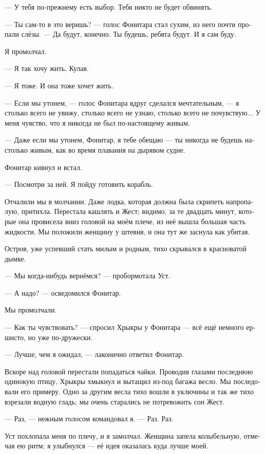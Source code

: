 \documentclass[a4paper,10pt,fleqn]{book}\usepackage{polyglossia}\setdefaultlanguage[babelshorthands=true]{russian}\setotherlanguage{english}\defaultfontfeatures{Ligatures=TeX,Mapping=tex-text}
\newcommand{\asterism}{\vspace{1em}{\centering\Large\bfseries$\ast~\ast~\ast$\par}\vspace{1em}}
\begin{document}
--- У тебя по-прежнему есть выбор.
Тебя никто не будет обвинять.

--- Ты сам-то в это веришь? --- голос Фонитара стал сухим, из него почти пропали слёзы.
--- Да будут, конечно.
Ты будешь, ребята будут.
И я сам буду.

Я промолчал.

--- Я так хочу жить, Кулав.

--- Я тоже.
И она тоже хочет жить.

--- Если мы утонем, --- голос Фонитара вдруг сделался мечтательным, --- я столько всего не увижу, столько всего не узнаю, столько всего не почувствую...
У меня чувство, что я никогда не был по-настоящему живым.

--- Даже если мы утонем, Фонитар, я тебе обещаю --- ты никогда не будешь настолько живым, как во время плавания на дырявом судне.

Фонитар кивнул и встал.

--- Посмотри за ней.
Я пойду готовить корабль.

\asterism

Отчалили мы в молчании.
Даже лодка, которая должна была скрипеть напропалую, притихла.
Перестала кашлять и Жест;
видимо, за те двадцать минут, которые она провисела вниз головой на моём плече, из неё вышла большая часть жидкости.
Мы положили женщину у штевня, и она тут же заснула как убитая.

Остров, уже успевший стать милым и родным, тихо скрывался в красноватой дымке.

--- Мы когда-нибудь вернёмся? --- пробормотала Уст.

--- А надо? --- осведомился Фонитар.

Мы промолчали.

--- Как ты чувствовать? --- спросил Хрыкры у Фонитара --- всё ещё немного ершисто, но уже по-дружески.

--- Лучше, чем я ожидал, --- лаконично ответил Фонитар.

Вскоре над головой перестали попадаться чайки.
Проводив глазами последнюю одинокую птицу, Хрыкры хмыкнул и вытащил из-под багажа весло.
Мы последовали его примеру.
Одно за другим весла тихо вошли в уключины и так же тихо взрезали водную гладь;
мы очень старались не потревожить сон Жест.

--- Раз, --- нежным голосом командовал я.
--- Раз.
Раз.

Уст похлопала меня по плечу, и я замолчал.
Женщина запела колыбельную, отмечая ею ритм;
я улыбнулся --- её идея оказалась куда лучше моей.
\end{document}
